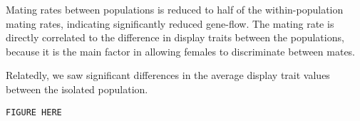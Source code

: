 Mating rates between populations is reduced to half of the within-population mating rates, indicating significantly reduced gene-flow. The mating rate is directly correlated to the difference in display traits between the populations, because it is the main factor in allowing females to discriminate between mates. 

Relatedly, we saw significant differences in the average display trait values between the isolated population.

\verb|FIGURE HERE|
